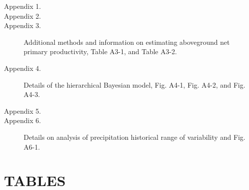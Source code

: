 \documentclass[fleqn,10pt,lineno]{wlpeerj} %
\begin{document}
\begin{description}
\item [Appendix 1.] 
\item [Appendix 2.] 
\item [Appendix 3.] Additional methods and information on estimating aboveground net primary productivity, Table A3-1, and Table A3-2.
\item [Appendix 4.] Details of the hierarchical Bayesian model, Fig. A4-1, Fig. A4-2, and Fig. A4-3.
\item [Appendix 5.] 
\item [Appendix 6.] Details on analysis of precipitation historical range of variability and Fig. A6-1.
\end{description}

\newpage{}

\section{TABLES}\label{tables}
\end{document}
